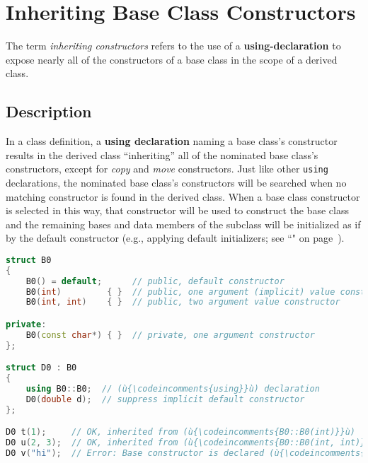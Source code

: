 \newpage
\section[Inheriting Ctors]{Inheriting Base Class Constructors}\label{ctorinheriting}\label{inheriting-constructors}


The term \textit{inheriting constructors} refers to the use of a
\textbf{{\ttfamily\bfseries using}-declaration} to expose nearly all of the
constructors of a base class in the scope of a derived class.

\subsection[Description]{Description}\label{description-inheritingctor}

In a class definition, a \textbf{{\ttfamily\bfseries using} declaration} naming a
base class's constructor results in the derived class ``inheriting'' all
of the nominated base class's constructors, except for \emph{copy} and
\emph{move} constructors. Just like other \texttt{using} declarations, the nominated base class's
constructors will be searched when no matching constructor is found in
the derived class. When a base class constructor is selected in this way,
that constructor will be used to construct the base class and the
remaining bases and data members of the subclass will be initialized as
if by the default constructor (e.g., applying default initializers;
see ``" on page~\pageref{Default-Member-Initializers}).

\begin{lstlisting}[language=C++]
struct B0
{
    B0() = default;      // public, default constructor
    B0(int)         { }  // public, one argument (implicit) value constructor
    B0(int, int)    { }  // public, two argument value constructor

private:
    B0(const char*) { }  // private, one argument constructor
};

struct D0 : B0
{
    using B0::B0;  // (ù{\codeincomments{using}}ù) declaration
    D0(double d);  // suppress implicit default constructor
};

D0 t(1);     // OK, inherited from (ù{\codeincomments{B0::B0(int)}}ù)
D0 u(2, 3);  // OK, inherited from (ù{\codeincomments{B0::B0(int, int)}}ù)
D0 v("hi");  // Error: Base constructor is declared (ù{\codeincomments{private}}ù).
\end{lstlisting}


